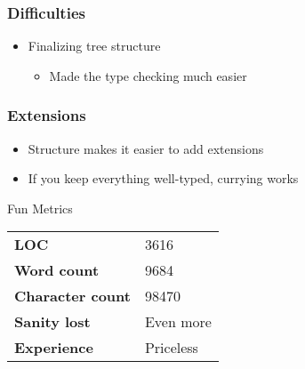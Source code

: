 \documentclass{beamer}
\begin{document}
\begin{frame}
\frametitle{Difficulties}
\begin{itemize}
\item Finalizing tree structure
\begin{itemize}
\item Made the type checking much easier
\end{itemize}
\end{itemize}
\end{frame}

\begin{frame}
\frametitle{Extensions}
\begin{itemize}
\item Structure makes it easier to add extensions
\item If you keep everything well-typed, currying works
\end{itemize}
\end{frame}

\begin{frame}
\begin{block}{Fun Metrics}
\begin{tabular}{l l}
\textbf{LOC} & 3616 \\
\textbf{Word count} & 9684 \\
\textbf{Character count} & 98470 \\
\textbf{Sanity lost} & Even more \\
\textbf{Experience} & Priceless 
\end{tabular}
\end{block}
\end{frame}

\begin{frame}
\end{frame}
\end{document}
